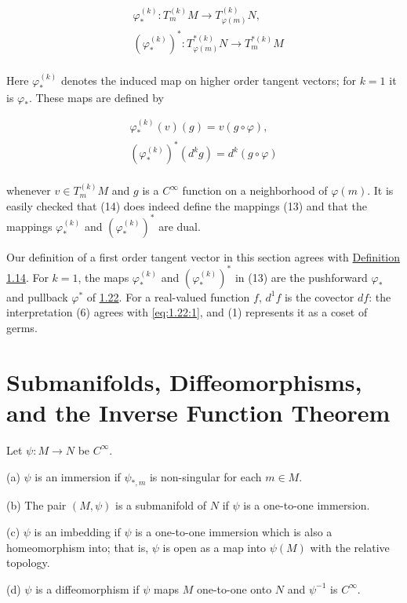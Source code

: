 \begin{equation}
	\tag{13}\label{eq:1.26:13}
	\begin{aligned}{}&{{}\varphi_*^{(k)}\colon T_{m}^{(k)} M\to T_{\varphi(m)}^{(k)} N,}\\ {}&{{}(\varphi_*^{(k)})^{*}\colon T_{\varphi(m)}^{*(k)} N\to T_{m}^{*(k)} M}\\ \end{aligned}
\end{equation}

Here $\varphi_*^{(k)}$ denotes the induced map on higher order tangent vectors; for $k=1$ it is $\varphi_*$. These maps are defined by

\begin{equation}
	\tag{14}\label{eq:1.26:14}
	\begin{array}{c}{\varphi_*^{(k)}(v)(g)=v(g\circ\varphi),}\\ {(\varphi_*^{(k)})^{*}(d^{k}g)=d^{k}(g\circ\varphi)}\\ \end{array}
\end{equation}

whenever $v\in T_{m}^{(k)} M$ and $g$ is a $C^{\infty}$ function on a neighborhood of $\varphi(m)$. It is easily checked that (14) does indeed define the mappings (13) and that the mappings $\varphi_*^{(k)}$ and $(\varphi_*^{(k)})^{*}$ are dual.

Our definition of a first order tangent vector in this section agrees with \hyperref[thm:1.14]{Definition 1.14}. For $k=1$, the maps $\varphi_*^{(k)}$ and $(\varphi_*^{(k)})^*$ in (13) are the pushforward $\varphi_*$ and pullback $\varphi^*$ of \hyperref[thm:1.22]{1.22}. For a real-valued function $f$, $d^1f$ is the covector $df$: the interpretation (6) agrees with \eqref{eq:1.22:1}, and (1) represents it as a coset of germs.


\section{Submanifolds, Diffeomorphisms, and the Inverse Function Theorem}


\begin{definition}\label{thm:1.27}
	Let  $ \psi\colon M \to N $ be  $ C^\infty $. 

	(a)  $ \psi $ is an immersion if  $ \psi_{*,m} $ is non-singular for each  $ m \in M $. 

	(b) The pair $(M,\psi)$ is a submanifold of $N$ if $\psi$ is a one-to-one immersion.

	(c)  $ \psi $ is an imbedding if  $ \psi $ is a one-to-one immersion which is also a homeomorphism into; that is,  $ \psi $ is open as a map into  $ \psi(M) $ with the relative topology. 

	(d)  $ \psi $ is a diffeomorphism if  $ \psi $ maps  $ M $ one-to-one onto  $ N $ and  $ \psi^{-1} $ is  $ C^\infty $. 

\end{definition}

